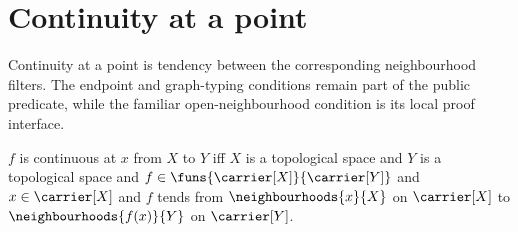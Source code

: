\section{Continuity at a point}






Continuity at a point is tendency between the corresponding neighbourhood
filters.  The endpoint and graph-typing conditions remain part of the public
predicate, while the familiar open-neighbourhood condition is its local proof
interface.

\begin{definition}\label{continuous_at}
    $f$ is continuous at $x$ from $X$ to $Y$ iff
        $X$ is a topological space and
        $Y$ is a topological space and
        $f\in\funs{\carrier[X]}{\carrier[Y]}$ and
        $x\in\carrier[X]$ and
        $f$ tends from $\neighbourhoods{x}{X}$ on $\carrier[X]$ to
            $\neighbourhoods{f(x)}{Y}$ on $\carrier[Y]$.
\end{definition}

